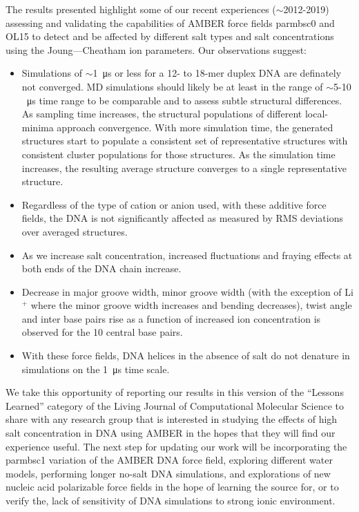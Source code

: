 \documentclass[9pt,lessons]{livecoms}
\begin{document}
The results presented highlight some of our recent experiences
($\sim$2012-2019) assessing and validating the capabilities of AMBER force
fields parmbsc0 and OL15 to detect and be affected by different salt
types and salt concentrations using the Joung—Cheatham ion
parameters. Our observations suggest:
\begin{itemize}

\item Simulations of $\sim$\SI{1}{\micro\second} or less for a 12- to
  18-mer duplex DNA are definately not converged. MD simulations
  should likely be at least in the range of $\sim$5-10
  \SI{}{\micro\second} time range to be comparable and to assess
  subtle structural differences. As sampling time increases, the
  structural populations of different local-minima approach
  convergence.  With more simulation time, the generated structures
  start to populate a consistent set of representative structures with
  consistent cluster populations for those structures. As the
  simulation time increases, the resulting average structure converges
  to a single representative structure.

\item Regardless of the type of cation or anion used, with these
  additive force fields, the DNA is not significantly affected as
  measured by RMS deviations over averaged structures.

\item As we increase salt concentration, increased fluctuations and
  fraying effects at both ends of the DNA chain increase.

\item Decrease in major groove width, minor groove width (with the
  exception of Li$^{+}$ where the minor groove width increases and
  bending decreases), twist angle and inter base pairs rise as a
  function of increased ion concentration is observed for the 10
  central base pairs.

\item With these force fields, DNA helices in the absence of salt do
  not denature in simulations on the \SI{1}{\micro\second} time scale.

\end{itemize}

We take this opportunity of reporting our results in this version of
the “Lessons Learned” category of the Living Journal of Computational
Molecular Science to share with any research group that is interested
in studying the effects of high salt concentration in DNA using AMBER
in the hopes that they will find our experience useful. The next step
for updating our work will be incorporating the parmbsc1 variation of
the AMBER DNA force field, exploring different water models,
performing longer no-salt DNA simulations, and explorations of new
nucleic acid polarizable force fields\cite{Li2017} in the hope of
learning the source for, or to verify the, lack of sensitivity of DNA
simulations to strong ionic environment.
\end{document}
